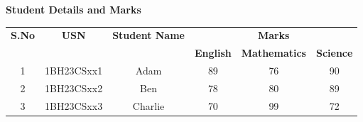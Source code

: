 \documentclass[a4paper]{article}
\begin{document}
\centering
    \textbf{\Large{Student Details and Marks}}
    \begin{table}[h]
        \begin{tabular}{|c|c|c|c|c|c|} 
            \hline
            \multirow{2}{*}{\textbf{S.No}} & \multirow{2}{*}{\textbf{USN}} & \multirow{2}{*}{\textbf{Student Name}} & \multicolumn{3}{c|}{\textbf{Marks}} \\
            \cline{4-6} & & & \textbf{English} & \textbf{Mathematics} & \textbf{Science} \\
            \hline
            1 & 1BH23CSxx1 & Adam & 89 & 76 & 90 \\ 
            \hline
            2 & 1BH23CSxx2 & Ben & 78 & 80 & 89 \\
            \hline
            3 & 1BH23CSxx3 & Charlie & 70 & 99 & 72 \\
            \hline
        \end{tabular}
    \end{table}
\end{document}
